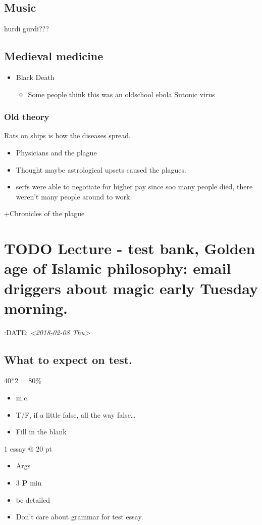 \documentclass[11pt]{article}
\begin{document}
\subsection{Music}
\label{sec-7-7}
hurdi gurdi???

\subsection{Medieval medicine}
\label{sec-7-8}
\begin{itemize}
\item Black Death
\begin{itemize}
\item Some people think this was an oldschool ebola 
Sutonic virus
\end{itemize}
\end{itemize}
\subsubsection{Old theory}
\label{sec-7-8-1}
Rats on ships is how the diseases spread.
\begin{itemize}
\item Physicians and the plague
\end{itemize}



\begin{itemize}
\item Thought maybe astrological upsets caused the plagues.\\
\item serfs were able to negotiate for higher pay since soo many people died, there weren't many people around to work.\\
\end{itemize}
+Chronicles of the plague

\section{{\bfseries\sffamily TODO} Lecture  - test bank, Golden age of Islamic philosophy: email driggers about magic early Tuesday morning.}
\label{sec-8}
:DATE: \textit{<2018-02-08 Thu>}

\subsection{What to expect on test.}
\label{sec-8-1}
40*2 = 80\%
\begin{itemize}
\item m.c.
\item T/F, if a little false, all the way false\ldots{}
\item Fill in the blank
\end{itemize}
1 essay @ 20 pt
\begin{itemize}
\item Args
\item 3 \textbf{P} min
\item be detailed
\item Don't care about grammar for test essay.
\end{itemize}
\end{document}
